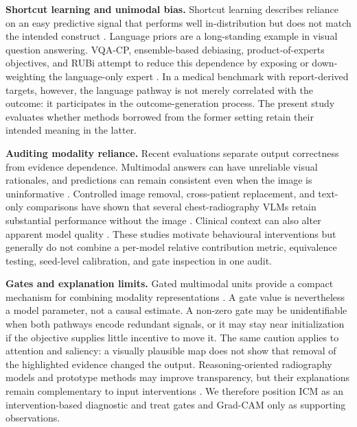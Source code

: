 \documentclass[a4paper,fleqn]{cas-sc}
\begin{document}
\textbf{Shortcut learning and unimodal bias.}
Shortcut learning describes reliance on an easy predictive signal that performs
well in-distribution but does not match the intended construct
\cite{geirhos2020shortcut}. Language priors are a long-standing example in
visual question answering. VQA-CP, ensemble-based debiasing, product-of-experts
objectives, and RUBi attempt to reduce this dependence by exposing or
down-weighting the language-only expert
\cite{agrawal2018dontassume,clark2019easyway,cadene2019rubi}. In a medical
benchmark with report-derived targets, however, the language pathway is not
merely correlated with the outcome: it participates in the outcome-generation
process. The present study evaluates whether methods borrowed from the former
setting retain their intended meaning in the latter.

\textbf{Auditing modality reliance.}
Recent evaluations separate output correctness from evidence dependence.
Multimodal answers can have unreliable visual rationales, and predictions can
remain consistent even when the image is uninformative
\cite{jin2024hiddenflaws,sadanandan2026consistentdangerous}. Controlled image
removal, cross-patient replacement, and text-only comparisons have shown that
several chest-radiography VLMs retain substantial performance without the image
\cite{lotfinia2026needimage}. Clinical context can also alter apparent model
quality \cite{wang2026clinicalcontext}. These studies motivate behavioural
interventions but generally do not combine a per-model relative contribution
metric, equivalence testing, seed-level calibration, and gate inspection in one
audit.

\textbf{Gates and explanation limits.}
Gated multimodal units provide a compact mechanism for combining modality
representations \cite{arevalo2017gmu}. A gate value is nevertheless a model
parameter, not a causal estimate. A non-zero gate may be unidentifiable when
both pathways encode redundant signals, or it may stay near initialization if
the objective supplies little incentive to move it. The same caution applies to
attention and saliency: a visually plausible map does not show that removal of
the highlighted evidence changed the output. Reasoning-oriented radiography
models and prototype methods may improve transparency, but their explanations
remain complementary to input interventions
\cite{myronenko2025reasoningcxr,chiang2026cxrnexus}. We therefore position ICM
as an intervention-based diagnostic and treat gates and Grad-CAM only as
supporting observations.
\end{document}
